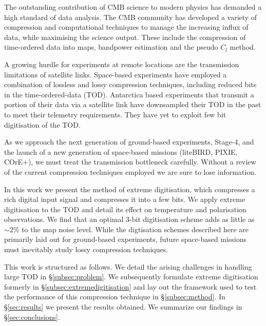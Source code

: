 \documentclass[apj]{emulateapj}
\begin{document}
The outstanding contribution of CMB science to modern physics has demanded a high standard of data analysis. The CMB community has developed a variety of compression and computational techniques to manage the increasing influx of data, while maximising the science output. These include the compression of time-ordered data into maps, bandpower estimation and the pseudo $C_l$ method.

A growing hurdle for experiments at remote locations are the transmission limitations of satellite links. Space-based experiments have employed a combination of lossless and lossy compression techniques, including reduced bits in the time-ordered-data (TOD). Antarctica based experiments that transmit a portion of their data via a satellite link have downsampled their TOD in the past to meet their telemetry requirements. They have yet to exploit few bit digitisation of the TOD.

As we approach the next generation of ground-based experiments, Stage-4, and the launch of a new generation of space-based missions (liteBIRD, PIXIE, COrE+), we must treat the transmission bottleneck carefully. Without a review of the current compression techniques employed we are sure to lose information.

In this work we present the method of extreme digitisation, which compresses a rich digital input signal and compresses it into a few bits. We apply extreme digitisation to the TOD and detail its effect on temperature and polarisation observations. We find that an optimal 3-bit digitisation scheme adds as little as $\sim 2\%$ to the map noise level. While the digtisation schemes described here are primarily laid out for ground-based experiments, future space-based missions must inevitably study lossy compression techniques.

This work is structured as follows. We detail the arising challenges in handling large TOD in \S\ref{subsec:problem}. We subsequently formulate extreme digitisation formerly in \S\ref{subsec:extremedigitisation} and lay out the framework used to test the performance of this compression technique in \S\ref{subsec:method}. In \S\ref{sec:results} we present the results obtained. We summarize our findings in \S\ref{sec:conclusions}. 



\end{document}
